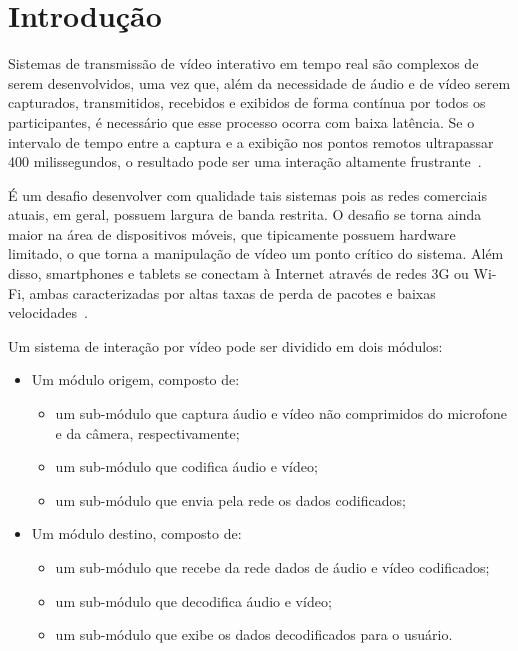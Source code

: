\documentclass{acm_proc_article-sp}
\begin{document}

\section{Introdução}

Sistemas de transmissão de vídeo interativo em tempo real são complexos de serem desenvolvidos, uma vez que, além da necessidade de áudio e de vídeo serem capturados, transmitidos, recebidos e exibidos de forma contínua por todos os participantes, é necessário que esse processo ocorra com baixa latência. Se o intervalo de tempo entre a captura e a exibição nos pontos remotos ultrapassar 400 milissegundos, o resultado pode ser uma interação altamente frustrante~\cite{kurose_2001}.

É um desafio desenvolver com qualidade tais sistemas pois as redes comerciais atuais, em geral, possuem largura de banda restrita. O desafio se torna ainda maior na área de dispositivos móveis, que tipicamente possuem hardware limitado, o que torna a manipulação de vídeo um ponto crítico do sistema. Além disso, smartphones e tablets se conectam à Internet através de redes 3G ou Wi-Fi, ambas caracterizadas por altas taxas de perda de pacotes e baixas velocidades~\cite{huynh-thu_2008}. 

Um sistema de interação por vídeo pode ser dividido em dois módulos:
\begin{itemize}
 \item Um módulo origem, composto de:
 \begin{itemize}
  \item um sub-módulo que captura áudio e vídeo não comprimidos do microfone e da câmera, respectivamente;
  \item um sub-módulo que codifica áudio e vídeo;
  \item um sub-módulo que envia pela rede os dados codificados;
 \end{itemize}
 \item Um módulo destino, composto de:
 \begin{itemize}
  \item um sub-módulo que recebe da rede dados de áudio e vídeo codificados;
  \item um sub-módulo que decodifica áudio e vídeo;
  \item um sub-módulo que exibe os dados decodificados para o usuário.
 \end{itemize}
\end{itemize}
\end{document}
